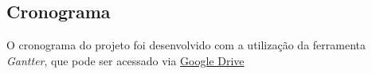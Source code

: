 	\subsection{Cronograma} %
	\label{sub:cronograma}
		
		O cronograma do projeto foi desenvolvido com a utilização da ferramenta \textit{Gantter}, que pode ser acessado via \href{https://www.smartapp.com/gantterforgoogledrive/index.html?fileID=0B7s5Po6PeeDMV2RhY2dWVEUtTUU#}{Google Drive}
